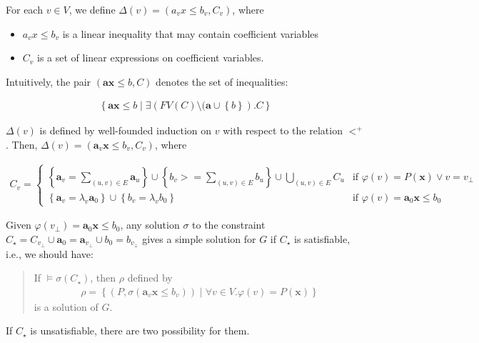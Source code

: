 \documentclass[a4paper,12pt]{article}
\begin{document}
For each $v \in V$, we define $\Delta(v) = (a_v x \leq b_v, C_v)$,
where
\begin{itemize}
\item $a_v x \leq b_v$ is a linear inequality that may contain
  coefficient variables
\item $C_v$ is a set of linear expressions on coefficient variables.
\end{itemize}
Intuitively, the pair $(\mathbf{a} \mathbf{x} \leq b, C)$ denotes the
set of inequalities:

\begin{align*}
\left\lbrace
 \mathbf{a} \mathbf{x} \leq b \middle|
 \exists \left( FV(C)
  \setminus (\mathbf{a} \cup \left\lbrace b \right\rbrace
 \right). C
\right\rbrace
\end{align*}

$\Delta(v)$ is defined by well-founded induction on $v$ with respect
to the relation $<^+$. Then,
$\Delta(v) = \left( \mathbf{a}_v \mathbf{x} \leq b_v, C_v \right)$,
where

\begin{align*}
C_v =
\begin{cases}
\left\lbrace \mathbf{a}_v = \sum_{(u,v) \in E} \mathbf{a}_u \right\rbrace \cup
\left\lbrace b_v >= \sum_{(u,v) \in E} b_u \right\rbrace \cup
\bigcup_{(u,v) \in E} C_u
& \mbox{if } \varphi(v) = P(\mathbf{x}) \vee v = v_\bot \\
\left\lbrace \mathbf{a}_v = \lambda_v \mathbf{a}_0 \right\rbrace \cup
\left\lbrace b_v = \lambda_v b_0 \right\rbrace
& \mbox{if } \varphi(v) = \mathbf{a}_0 \mathbf{x} \leq b_0
\end{cases}
\end{align*}

Given $\varphi(v_\bot) = \mathbf{a}_0 \mathbf{x} \leq b_0$, any
solution $\sigma$ to the constraint $C_\star = C_{v_\bot} \cup {
  \mathbf{a}_0 = \mathbf{a}_{v_\bot} } \cup { b_0 = b_{v_\bot} }$
gives a simple solution for $G$ if $C_\star$ is satisfiable, i.e., we
should have:

\begin{quote}
If $\models \sigma(C_\star)$, then $\rho$ defined by
\begin{align*}
 \rho = \left\lbrace
  \left( P, \sigma(\mathbf{a}_v \mathbf{x} \leq b_v) \right) \middle|
  \forall v \in V. \varphi(v) = P(\mathbf{x})
 \right\rbrace
\end{align*}
is a solution of $G$.
\end{quote}

If $C_\star$ is unsatisfiable, there are two possibility for them.
\end{document}
